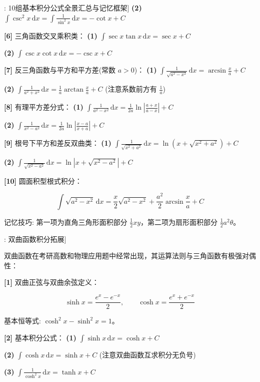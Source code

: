 \documentclass[11pt,a4paper,UTF8]{ctexart}
\begin{document}
\begin{thmbox}[公式[1]: 10组基本积分公式全景汇总与记忆框架]
\textbf{(2)}  $\int \csc^2 x\,\mathrm{d}x = \int \frac{1}{\sin^2 x}\,\mathrm{d}x = -\cot x + C$

\textbf{[6]} 三角函数交叉乘积类：
\textbf{(1)}  $\int \sec x \tan x\,\mathrm{d}x = \sec x + C$

\textbf{(2)}  $\int \csc x \cot x\,\mathrm{d}x = -\csc x + C$

\textbf{[7]} 反三角函数与平方和平方差(常数 $a > 0$)：
\textbf{(1)}  $\int \frac{1}{\sqrt{a^2-x^2}}\,\mathrm{d}x = \arcsin\frac{x}{a} + C$

\textbf{(2)}  $\int \frac{1}{a^2+x^2}\,\mathrm{d}x = \frac{1}{a}\arctan\frac{x}{a} + C$ (注意系数前方有 $\frac{1}{a}$)

\textbf{[8]} 有理平方差分式：
\textbf{(1)}  $\int \frac{1}{a^2-x^2}\,\mathrm{d}x = \frac{1}{2a}\ln\left|\frac{a+x}{a-x}\right| + C$

\textbf{(2)}  $\int \frac{1}{x^2-a^2}\,\mathrm{d}x = \frac{1}{2a}\ln\left|\frac{x-a}{x+a}\right| + C$

\textbf{[9]} 根号下平方和差反双曲类：
\textbf{(1)}  $\int \frac{1}{\sqrt{x^2+a^2}}\,\mathrm{d}x = \ln\left(x + \sqrt{x^2+a^2}\right) + C$

\textbf{(2)}  $\int \frac{1}{\sqrt{x^2-a^2}}\,\mathrm{d}x = \ln\left|x + \sqrt{x^2-a^2}\right| + C$

\textbf{[10]} 圆面积型根式积分：

\begin{equation*}
\int \sqrt{a^2-x^2}\,\mathrm{d}x = \frac{x}{2}\sqrt{a^2-x^2} + \frac{a^2}{2}\arcsin\frac{x}{a} + C
\end{equation*}


记忆技巧: 第一项为直角三角形面积部分 $\frac{1}{2}x y$，第二项为扇形面积部分 $\frac{1}{2}a^2 \theta$。

\end{thmbox}
\begin{thmbox}[公式[2]: 双曲函数积分拓展]

双曲函数在考研高数和物理应用题中经常出现，其运算法则与三角函数有极强对偶性：

\textbf{[1]} 双曲正弦与双曲余弦定义：

\begin{equation*}
\sinh x = \frac{e^x - e^{-x}}{2}, \qquad \cosh x = \frac{e^x + e^{-x}}{2}
\end{equation*}


基本恒等式: $\cosh^2 x - \sinh^2 x = 1$。

\textbf{[2]} 基本积分公式：
\textbf{(1)}  $\int \sinh x\,\mathrm{d}x = \cosh x + C$

\textbf{(2)}  $\int \cosh x\,\mathrm{d}x = \sinh x + C$ (注意双曲函数互求积分无负号)

\textbf{(3)}  $\int \frac{1}{\cosh^2 x}\,\mathrm{d}x = \tanh x + C$

\end{thmbox}
\end{document}
